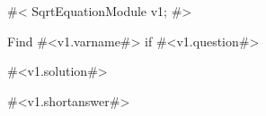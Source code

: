 

#<
SqrtEquationModule v1;
#>

Find #<v1.varname#> if #<v1.question#>

#<v1.solution#>

#<v1.shortanswer#>


